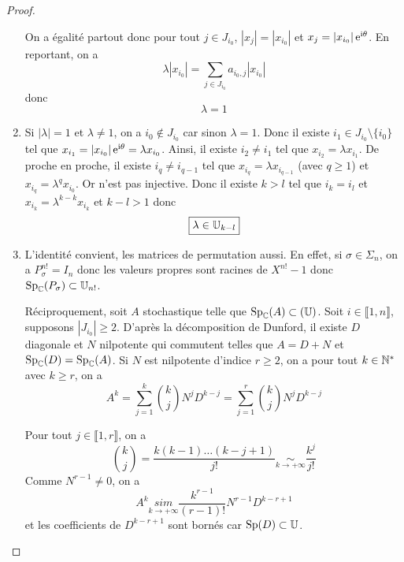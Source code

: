 \documentclass[12pt]{article}
\begin{document}
\begin{proof}
\begin{enumerate}
		On a égalité partout donc pour tout $j\in J_{i_{0}}$, $\left\lvert x_{j}\right\rvert=\left\lvert x_{i_{0}}\right\rvert$ et $x_{j}=\left\lvert x_{i_{0}}\right\rvert\mathrm{e}^{\mathrm{i} \theta}$. En reportant, on a 
		\begin{equation}
			\lambda\left\lvert x_{i_{0}}\right\rvert=\sum_{j\in J_{i_{0}}}a_{i_{0},j}\left\lvert x_{i_{0}}\right\rvert
		\end{equation}
		donc 
		\begin{equation}
			\boxed{\lambda=1}
		\end{equation}

		\item Si $\left\lvert\lambda\right\rvert=1$ et $\lambda\neq1$, on a $i_{0}\notin J_{i_{0}}$ car sinon $\lambda=1$. Donc il existe $i_{1}\in J_{i_{0}}\setminus\lbrace i_{0}\rbrace$ tel que $x_{i_{1}}=\left\lvert x_{i_{0}}\right\rvert\mathrm{e}^{\mathrm{i}\theta}=\lambda x_{i_{0}}$. Ainsi, il existe $i_{2}\neq i_{1}$ tel que $x_{i_{2}}=\lambda x_{i_{1}}$. De proche en proche, il existe $i_{q}\neq i_{q-1}$ tel que $x_{i_{q}}=\lambda x_{i_{q-1}}$ (avec $q\geqslant1$) et $x_{i_{q}}=\lambda^{q}x_{i_{0}}$. Or  n'est pas injective. Donc il existe $k>l$ tel que $i_{k}=i_{l}$ et $x_{i_{k}}=\lambda^{k-k}x_{i_{k}}$ et $k-l>1$ donc 
		\begin{equation}
			\boxed{
				\lambda\in\mathbb{U}_{k-l}
			}
		\end{equation}

		\item L'identité convient, les matrices de permutation aussi. En effet, si $\sigma\in\Sigma_{n}$, on a $P_{\sigma}^{n!}=I_{n}$ donc les valeurs propres sont racines de $X^{n!}-1$ donc $\operatorname{Sp}_{\mathbb{C}}(P_{\sigma})\subset\mathbb{U}_{n!}$.
		
		Réciproquement, soit $A$ stochastique telle que $\operatorname{Sp}_{\mathbb{C}}(A)\subset(\mathbb{U})$. Soit $i\in\llbracket1,n\rrbracket$, supposons $\left\lvert J_{i_{0}}\right\rvert\geqslant2$. D'après la décomposition de Dunford, il existe $D$ diagonale et $N$ nilpotente qui commutent telles que $A=D+N$ et $\operatorname{Sp}_{\mathbb{C}}(D)=\operatorname{Sp}_{\mathbb{C}}(A)$. Si $N$ est nilpotente d'indice $r\geqslant2$, on a pour tout $k\in\mathbb{N}^{*}$ avec $k\geqslant r$, on a 
		\begin{equation}
			A^{k}=\sum_{j=1}^{k}\binom{k}{j}N^{j}D^{k-j}=\sum_{j=1}^{r}\binom{k}{j}N^{j}D^{k-j}
		\end{equation}

		Pour tout $j\in\llbracket1,r\rrbracket$, on a 
		\begin{equation}
			\binom{k}{j}=\frac{k(k-1)\dots(k-j+1)}{j!}\underset{k\to+\infty}{\sim}\frac{k^{j}}{j!}
		\end{equation}
		Comme $N^{r-1}\neq0$, on a 
		\begin{equation}
			A^{k}\underset{k\to+\infty}{sim}\frac{k^{r-1}}{(r-1)!}N^{r-1}D^{k-r+1}
		\end{equation}
		et les coefficients de $D^{k-r+1}$ sont bornés car $\operatorname{Sp}(D)\subset\mathbb{U}$.


\end{enumerate}
\end{proof}
\end{document}
